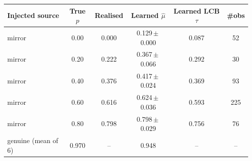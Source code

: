 \begin{tabular}{l ccccc}
\toprule
Injected source & True $p$ & Realised & Learned $\hat\mu$ & Learned LCB $\tau$ & \#obs \\
\midrule
mirror & 0.00 & 0.000 & 0.129\,$\pm$\,0.000 & 0.087 & 52 \\
mirror & 0.20 & 0.222 & 0.367\,$\pm$\,0.066 & 0.292 & 30 \\
mirror & 0.40 & 0.376 & 0.417\,$\pm$\,0.024 & 0.369 & 93 \\
mirror & 0.60 & 0.616 & 0.624\,$\pm$\,0.036 & 0.593 & 225 \\
mirror & 0.80 & 0.798 & 0.798\,$\pm$\,0.029 & 0.756 & 76 \\
\midrule
genuine (mean of 6) & 0.970 & -- & 0.948 & -- & -- \\
\bottomrule
\end{tabular}

